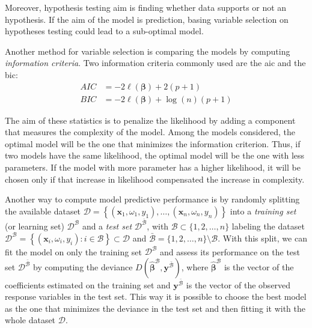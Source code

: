 \documentclass[a4paper, twoside, openright, 12pt]{report}
\theoremstyle{definition}
\theoremstyle{definition}
\theoremstyle{definition}
\theoremstyle{remark}
\begin{document}
Moreover, hypothesis testing aim is finding whether data supports or not an hypothesis. If the aim of the model is prediction, basing variable selection on hypotheses testing could lead to a sub-optimal model.

Another method for variable selection is comparing the models by computing \emph{information criteria}. Two information criteria commonly used are the \ac{aic} and the \ac{bic}:
\begin{align*}
AIC & = -2\ell(\boldsymbol{\beta}) + 2 (p+1) \\
BIC & = -2\ell(\boldsymbol{\beta}) + \log(n) (p+1)
\end{align*}

The aim of these statistics is to penalize the likelihood by adding a component that measures the complexity of the model. Among the models considered, the optimal model will be the one that minimizes the information criterion. Thus, if two models have the same likelihood, the optimal model will be the one with less parameters. If the model with more parameter has a higher likelihood, it will be chosen only if that increase in likelihood compensated the increase in complexity.

Another way to compute model predictive performance is by randomly splitting the available dataset \(\mathcal{D} = \left\{ (\boldsymbol{x}_1, \omega_1, y_1), \dots, (\boldsymbol{x}_n, \omega_n, y_n) \right\}\) into a \emph{training set} (or learning set) \(\mathcal{D}^{\mathcal{B}}\) and a \emph{test set} \(\mathcal{D}^{\bar{\mathcal{B}}}\), with \(\mathcal{B}\subset\{1,2,\dots,n\}\) labeling the dataset \(\mathcal{D}^{\mathcal{B}} = \left\{ (\boldsymbol{x}_i, \omega_i, y_i): i \in \mathcal{B} \right\} \subset \mathcal{D}\) and \(\bar{\mathcal{B}} = \{1, 2, \dots, n\} \setminus \mathcal{B}\). With this split, we can fit the model on only the training set \(\mathcal{D}^{\mathcal{B}}\) and assess its performance on the test set \(\mathcal{D}^{\bar{\mathcal{B}}}\) by computing the deviance \(D\left( \hat{\boldsymbol{\beta}}^{\mathcal{B}}, \boldsymbol{y}^{\bar{\mathcal{B}}} \right)\), where \(\hat{\boldsymbol{\beta}}^{\mathcal{B}}\) is the vector of the coefficients estimated on the training set and \(\boldsymbol{y}^{\bar{\mathcal{B}}}\) is the vector of the observed response variables in the test set. This way it is possible to choose the best model as the one that minimizes the deviance in the test set and then fitting it with the whole dataset \(\mathcal{D}\).
\end{document}
